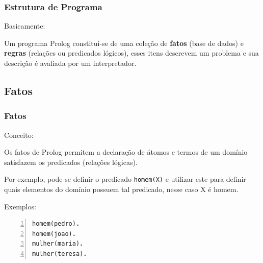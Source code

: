 \documentclass[sans]{beamer}
\begin{document}
\begin{frame}[fragile]   %
\frametitle{Estrutura de Programa}
\begin{block}{Basicamente:}

Um programa Prolog constitui-se de uma coleção de \textbf{fatos} (base de dados) e \textbf{regras} (relações ou predicados  lógicos), 
esses itens descrevem um problema e sua descrição é avaliada por um interpretador.


\end{block}   
\end{frame}


\subsection{Fatos} 
\begin{frame}[fragile]   %

\frametitle{Fatos}

\begin{block}{Conceito:}

 Os fatos de Prolog permitem a  declaração de
átomos e termos
 de um domínio satisfazem os predicados (relações lógicas).\vspace{1cm}
 
 Por exemplo,
pode-se definir o predicado \texttt{homem(X)} e utilizar este para definir quais elementos do domínio
possuem tal predicado, nesse caso X é homem.

\end{block}

\begin{block}{Exemplos:}
\begin{lstlisting}[language=Prolog, 
                   basicstyle=\footnotesize\ttfamily,
                  backgroundcolor=\color{azulclaro}, 
                  keywordstyle=\color{red},   
                  keepspaces=true,    
                  keywordstyle=\color{magenta},
     numberstyle=\tiny\color{magenta},
     commentstyle=\color{green},             
    numbers=left,                    
    numbersep=5pt]
homem(pedro).
homem(joao).
mulher(maria).
mulher(teresa).
\end{lstlisting}
\end{block}   
\end{frame}
\end{document}
